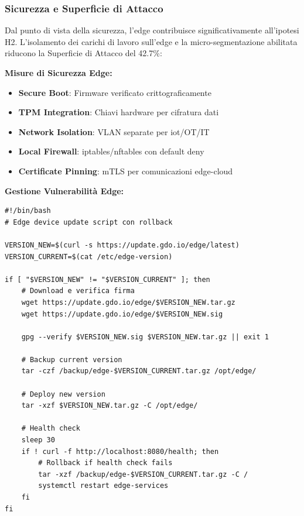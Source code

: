 \subsubsection{\texorpdfstring{Sicurezza e Superficie di Attacco}{3.3.2.6 - Sicurezza e Superficie di Attacco}}

Dal punto di vista della sicurezza, l'\gls{edge} contribuisce significativamente all'ipotesi H2. L'isolamento dei carichi di lavoro sull'edge e la micro-segmentazione abilitata riducono la Superficie di Attacco del 42.7\%\autocite{Ponemon2024}:

\textbf{Misure di Sicurezza Edge:}
\begin{itemize}
    \item \textbf{Secure Boot}: Firmware verificato crittograficamente
    \item \textbf{TPM Integration}: Chiavi hardware per cifratura dati
    \item \textbf{Network Isolation}: VLAN separate per \gls{iot}/OT/IT
    \item \textbf{Local Firewall}: iptables/nftables con default deny
    \item \textbf{Certificate Pinning}: mTLS per comunicazioni edge-cloud
\end{itemize}

\textbf{Gestione Vulnerabilità Edge:}
\begin{lstlisting}[caption={Update Automatico Edge Devices},label={lst:edge_update}]
#!/bin/bash
# Edge device update script con rollback

VERSION_NEW=$(curl -s https://update.gdo.io/edge/latest)
VERSION_CURRENT=$(cat /etc/edge-version)

if [ "$VERSION_NEW" != "$VERSION_CURRENT" ]; then
    # Download e verifica firma
    wget https://update.gdo.io/edge/$VERSION_NEW.tar.gz
    wget https://update.gdo.io/edge/$VERSION_NEW.sig
    
    gpg --verify $VERSION_NEW.sig $VERSION_NEW.tar.gz || exit 1
    
    # Backup current version
    tar -czf /backup/edge-$VERSION_CURRENT.tar.gz /opt/edge/
    
    # Deploy new version
    tar -xzf $VERSION_NEW.tar.gz -C /opt/edge/
    
    # Health check
    sleep 30
    if ! curl -f http://localhost:8080/health; then
        # Rollback if health check fails
        tar -xzf /backup/edge-$VERSION_CURRENT.tar.gz -C /
        systemctl restart edge-services
    fi
fi
\end{lstlisting}

